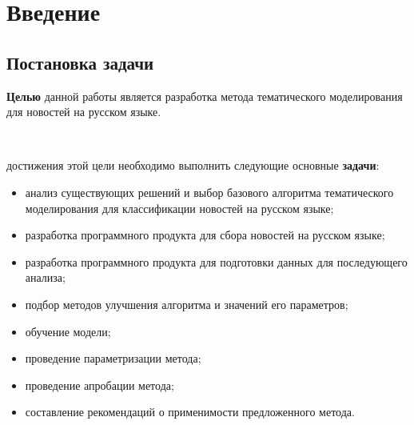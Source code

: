\chapter{Введение}

%
\section{Постановка задачи}

\noindent\textbf{Целью} данной работы является разработка метода тематического моделирования для новостей на русском языке.

~\

 достижения этой цели необходимо выполнить следующие основные \textbf{задачи}:

\begin{itemize}
    \item анализ существующих решений и выбор базового алгоритма тематического моделирования для классификации новостей на русском языке;
    \item разработка программного продукта для сбора новостей на русском языке;
    \item разработка программного продукта для подготовки данных для последующего анализа;
    \item подбор методов улучшения алгоритма и значений его параметров;
    \item обучение модели;
    \item проведение параметризации метода;
    \item проведение апробации метода;
    \item составление рекомендаций о применимости предложенного метода.
\end{itemize}


